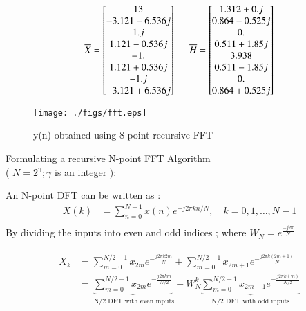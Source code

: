 \documentclass[journal,12pt,twocolumn]{IEEEtran}
\begin{document}
\begin{equation}
    \overline{X} =
\begin{bmatrix}
 13 \\   -3.121-6.536j \\  1.j \\     1.121-0.536j \\ -1.\\1.121+0.536j\\ -1.j\\    -3.121+6.536j
\end{bmatrix}
 \hspace{5mm}  \overline{H} =
\begin{bmatrix}
1.312+0.j \\    0.864-0.525j \\ 0.  \\    0.511+1.85j \\ 3.938 \\
 0.511-1.85j \\  0.  \\    0.864+0.525j
\end{bmatrix}
\end{equation}

\begin{figure}[!ht]

	\texttt{[image: ./figs/fft.eps]}
	\caption{y(n) obtained using 8 point recursive FFT}
\end{figure}
\bigskip

Formulating a recursive N-point FFT Algorithm \\ ( $N = 2^{\gamma};  \gamma$ is an integer ): 

    An N-point DFT can be written as : 
    \begin{align}
       X(k) &=  \sum_{n=0}^{N-1} x(n)e^{-j2\pi kn/N}, \quad k=0,1, \ldots, N-1 \\
    \end{align}
By dividing the inputs into even and odd indices ; where $W_{N} = e^{\frac{-j 2\pi }{N}} $

\begin{align}
\begin{split}
 X_{k} &=  \sum_{m=0}^{N/2 -1} x_{2m}e^{-\frac{j2\pi k2m}{N}} + \sum_{m=0}^{N/2 -1} x_{2m+1}e^{-\frac{j2\pi k(2m+1)}{N}}\\
       &=  \underbrace{\sum_{m=0}^{N/2 -1} x_{2m}e^{-\frac{j2\pi km}{N/2}}}_\text{ N/2 DFT with even inputs} + W_{N}^k \underbrace{\sum_{m=0}^{N/2 -1} x_{2m+1}e^{-\frac{j2\pi k(m)}{N/2}}}_\text{N/2 DFT with odd inputs}
\end{split}
\end{align}
\end{document}
